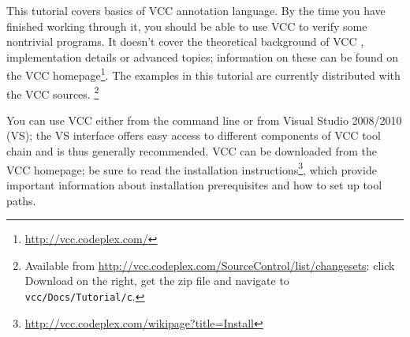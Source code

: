 This tutorial covers basics of VCC annotation language. By the time
you have finished working through it, you should be able to use VCC to
verify some nontrivial programs. It doesn't cover the theoretical
background of VCC \cite{lci}, implementation details \cite{vcc}
or advanced topics;
information on these can be found on the VCC
homepage\footnote{\url{http://vcc.codeplex.com/}}.
The examples in this tutorial are currently distributed with the VCC sources.%
\footnote{
Available from \url{http://vcc.codeplex.com/SourceControl/list/changesets}: click Download on the right,
get the zip file and navigate to \lstinline|vcc/Docs/Tutorial/c|.}

You can use VCC either from the command line or from Visual Studio
2008/2010 (VS); the VS interface offers easy access to different components of
VCC tool chain and is thus generally recommended.
VCC can be downloaded from the VCC homepage; 
be sure to read the installation instructions\footnote{\url{http://vcc.codeplex.com/wikipage?title=Install}},
which provide important information about installation prerequisites 
and how to set up tool paths.

